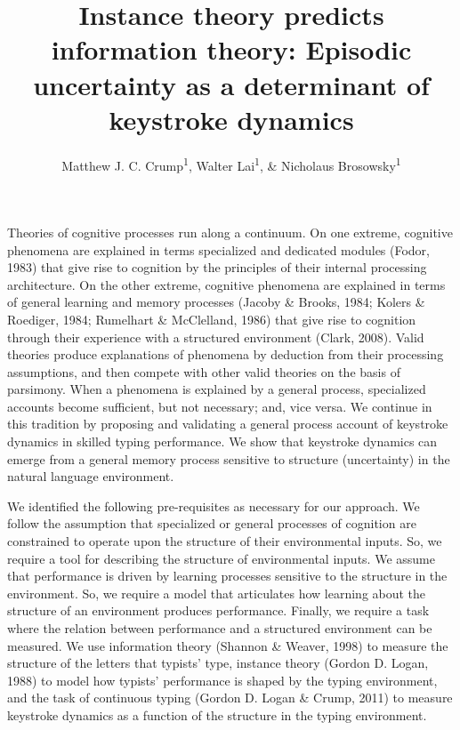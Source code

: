\documentclass[floatsintext,man]{apa6}
\title{Instance theory predicts information theory: Episodic uncertainty as a
determinant of keystroke dynamics}
\author{Matthew J. C. Crump\textsuperscript{1}, Walter Lai\textsuperscript{1}, \& Nicholaus Brosowsky\textsuperscript{1}}
\affiliation{
    \vspace{0.5cm}
          \textsuperscript{1} Brooklyn College of the City University of New York  }
\theoremstyle{definition}
\theoremstyle{definition}
\theoremstyle{definition}
\theoremstyle{remark}
\begin{document}
\maketitle

\setcounter{secnumdepth}{0}



Theories of cognitive processes run along a continuum. On one extreme,
cognitive phenomena are explained in terms specialized and dedicated
modules (Fodor, 1983) that give rise to cognition by the principles of
their internal processing architecture. On the other extreme, cognitive
phenomena are explained in terms of general learning and memory
processes (Jacoby \& Brooks, 1984; Kolers \& Roediger, 1984; Rumelhart
\& McClelland, 1986) that give rise to cognition through their
experience with a structured environment (Clark, 2008). Valid theories
produce explanations of phenomena by deduction from their processing
assumptions, and then compete with other valid theories on the basis of
parsimony. When a phenomena is explained by a general process,
specialized accounts become sufficient, but not necessary; and, vice
versa. We continue in this tradition by proposing and validating a
general process account of keystroke dynamics in skilled typing
performance. We show that keystroke dynamics can emerge from a general
memory process sensitive to structure (uncertainty) in the natural
language environment.

We identified the following pre-requisites as necessary for our
approach. We follow the assumption that specialized or general processes
of cognition are constrained to operate upon the structure of their
environmental inputs. So, we require a tool for describing the structure
of environmental inputs. We assume that performance is driven by
learning processes sensitive to the structure in the environment. So, we
require a model that articulates how learning about the structure of an
environment produces performance. Finally, we require a task where the
relation between performance and a structured environment can be
measured. We use information theory (Shannon \& Weaver, 1998) to measure
the structure of the letters that typists' type, instance theory (Gordon
D. Logan, 1988) to model how typists' performance is shaped by the
typing environment, and the task of continuous typing (Gordon D. Logan
\& Crump, 2011) to measure keystroke dynamics as a function of the
structure in the typing environment.
\end{document}
